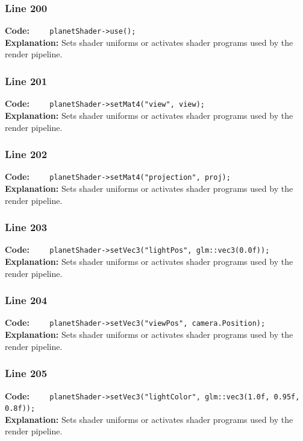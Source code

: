 \documentclass[11pt,a4paper]{article}
\begin{document}
\subsubsection*{Line 200}
\textbf{Code:} \verb|    planetShader->use();|\\
\textbf{Explanation:} Sets shader uniforms or activates shader programs used by the render pipeline.

\subsubsection*{Line 201}
\textbf{Code:} \verb|    planetShader->setMat4("view", view);|\\
\textbf{Explanation:} Sets shader uniforms or activates shader programs used by the render pipeline.

\subsubsection*{Line 202}
\textbf{Code:} \verb|    planetShader->setMat4("projection", proj);|\\
\textbf{Explanation:} Sets shader uniforms or activates shader programs used by the render pipeline.

\subsubsection*{Line 203}
\textbf{Code:} \verb|    planetShader->setVec3("lightPos", glm::vec3(0.0f));|\\
\textbf{Explanation:} Sets shader uniforms or activates shader programs used by the render pipeline.

\subsubsection*{Line 204}
\textbf{Code:} \verb|    planetShader->setVec3("viewPos", camera.Position);|\\
\textbf{Explanation:} Sets shader uniforms or activates shader programs used by the render pipeline.

\subsubsection*{Line 205}
\textbf{Code:} \verb|    planetShader->setVec3("lightColor", glm::vec3(1.0f, 0.95f, 0.8f));|\\
\textbf{Explanation:} Sets shader uniforms or activates shader programs used by the render pipeline.
\end{document}
